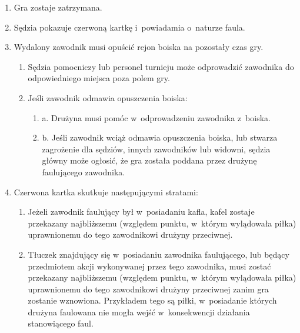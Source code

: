 \documentclass[12pt]{article}
\begin{document}
\begin{enumerate}
	\item
	      Gra zostaje zatrzymana.
	\item
	      Sędzia pokazuje czerwoną kartkę i~powiadamia o~naturze faula.
	\item
	      Wydalony zawodnik musi opuścić rejon boiska na pozostały czas gry.

	      \begin{enumerate}
		      \item
		            Sędzia pomocniczy lub personel turnieju może odprowadzić zawodnika
		            do odpowiedniego miejsca poza polem gry.
		      \item
		            Jeśli zawodnik odmawia opuszczenia boiska:

		            \begin{enumerate}
			            \item
			                  a. Drużyna musi pomóc w~odprowadzeniu zawodnika z~boiska.
			            \item
			                  b. Jeśli zawodnik wciąż odmawia opuszczenia boiska, lub stwarza
			                  zagrożenie dla sędziów, innych zawodników lub widowni, sędzia
			                  główny może ogłosić, że gra została poddana przez drużynę
			                  faulującego zawodnika.
		            \end{enumerate}
	      \end{enumerate}
	\item
	      Czerwona kartka skutkuje następującymi stratami:

	      \begin{enumerate}
		      \item
		            Jeżeli zawodnik faulujący był w~posiadaniu kafla, kafel zostaje
		            przekazany najbliższemu (względem punktu, w~którym wylądowała piłka)
		            uprawnionemu do tego zawodnikowi drużyny przeciwnej.
		      \item
		            Tłuczek znajdujący się w~posiadaniu zawodnika faulującego, lub
		            będący przedmiotem akcji wykonywanej przez tego zawodnika, musi
		            zostać przekazany najbliższemu (względem punktu, w~którym wylądowała
		            piłka) uprawnionemu do tego zawodnikowi drużyny przeciwnej zanim gra
		            zostanie wznowiona. Przykładem tego są piłki, w~posiadanie których
		            drużyna faulowana nie mogła wejść w~konsekwencji działania
		            stanowiącego faul.


\end{enumerate}
\end{enumerate}
\end{document}
